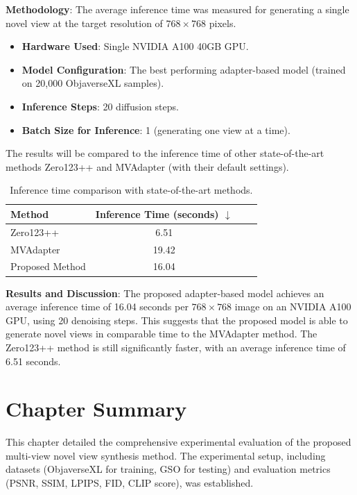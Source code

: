 \textbf{Methodology}:
The average inference time was measured for generating a single novel view at the target resolution of $768 \times 768$ pixels.
\begin{itemize}
  \item \textbf{Hardware Used}: Single NVIDIA A100 40GB GPU.
  \item \textbf{Model Configuration}: The best performing adapter-based model (trained on 20,000 ObjaverseXL samples).
  \item \textbf{Inference Steps}: 20 diffusion steps.
  \item \textbf{Batch Size for Inference}: 1 (generating one view at a time).
\end{itemize}

The results will be compared to the inference time of other state-of-the-art methods Zero123++ \cite{zero1to3} and MVAdapter \cite{mvadapter} (with their default settings).

\begin{table}[htbp]
  \centering
  \caption{Inference time comparison with state-of-the-art methods.}
  \label{tab:inference_time_comparison}
  \begin{tabular}{lccc}
    \toprule
    \textbf{Method} & \textbf{Inference Time (seconds)} $\downarrow$ \\
    \midrule
    Zero123++ \cite{zero1to3} & 6.51 \\
    MVAdapter \cite{mvadapter} & 19.42 \\
    Proposed Method & 16.04 \\
    \bottomrule
  \end{tabular}
\end{table}

\textbf{Results and Discussion}: The proposed adapter-based model achieves an average inference time of 16.04 seconds per $768 \times 768$ image on an NVIDIA A100 GPU, using 20 denoising steps. This suggests that the proposed model is able to generate novel views in comparable time to the MVAdapter method. The Zero123++ method is still significantly faster, with an average inference time of 6.51 seconds.

\section{Chapter Summary}\label{sec:exp_summary}
This chapter detailed the comprehensive experimental evaluation of the proposed multi-view novel view synthesis method. The experimental setup, including datasets (ObjaverseXL for training, GSO for testing) and evaluation metrics (PSNR, SSIM, LPIPS, FID, CLIP score), was established.

